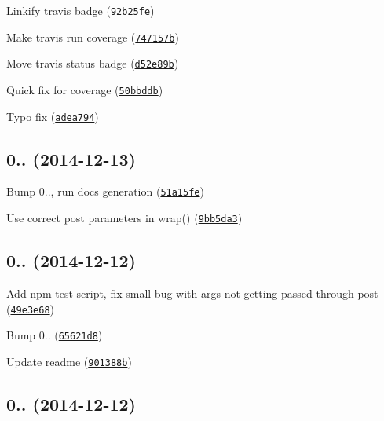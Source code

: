 \begin{DoxyItemize}
\item Linkify travis badge (\href{https://github.com/vkarpov15/kareem/commit/92b25fe}{\tt 92b25fe})
\item Make travis run coverage (\href{https://github.com/vkarpov15/kareem/commit/747157b}{\tt 747157b})
\item Move travis status badge (\href{https://github.com/vkarpov15/kareem/commit/d52e89b}{\tt d52e89b})
\item Quick fix for coverage (\href{https://github.com/vkarpov15/kareem/commit/50bbddb}{\tt 50bbddb})
\item Typo fix (\href{https://github.com/vkarpov15/kareem/commit/adea794}{\tt adea794})
\end{DoxyItemize}

\label{_0.0.4}%
 \subsection*{
\footnotesize 0.. (2014-\/12-\/13)
\normalsize }


\begin{DoxyItemize}
\item Bump 0.., run docs generation (\href{https://github.com/vkarpov15/kareem/commit/51a15fe}{\tt 51a15fe})
\item Use correct post parameters in wrap() (\href{https://github.com/vkarpov15/kareem/commit/9bb5da3}{\tt 9bb5da3})
\end{DoxyItemize}

\label{_0.0.3}%
 \subsection*{
\footnotesize 0.. (2014-\/12-\/12)
\normalsize }


\begin{DoxyItemize}
\item Add npm test script, fix small bug with args not getting passed through post (\href{https://github.com/vkarpov15/kareem/commit/49e3e68}{\tt 49e3e68})
\item Bump 0.. (\href{https://github.com/vkarpov15/kareem/commit/65621d8}{\tt 65621d8})
\item Update readme (\href{https://github.com/vkarpov15/kareem/commit/901388b}{\tt 901388b})
\end{DoxyItemize}

\label{_0.0.2}%
 \subsection*{
\footnotesize 0.. (2014-\/12-\/12)
\normalsize }


